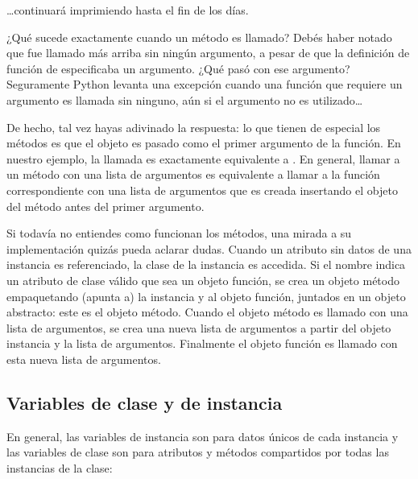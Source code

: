\documentclass[a4,10pt,spanish]{sphinxmanual}
\begin{document}
\sphinxAtStartPar
…continuará imprimiendo  hasta el fin de los días.

\sphinxAtStartPar
¿Qué sucede exactamente cuando un método es llamado?  Debés haber notado que  fue llamado más arriba sin ningún argumento, a pesar de que la definición de función de  especificaba un argumento.  ¿Qué pasó con ese argumento?  Seguramente Python levanta una excepción cuando una función que requiere un argumento es llamada sin ninguno, aún si el argumento no es utilizado…

\sphinxAtStartPar
De hecho, tal vez hayas adivinado la respuesta: lo que tienen de especial los métodos es que el objeto es pasado como el primer argumento de la función. En nuestro ejemplo, la llamada  es exactamente equivalente a .  En general, llamar a un método con una lista de  argumentos es equivalente a llamar a la función correspondiente con una lista de argumentos que es creada insertando el objeto del método antes del primer argumento.

\sphinxAtStartPar
Si todavía no entiendes como funcionan los métodos, una mirada a su implementación quizás pueda aclarar dudas. Cuando un atributo sin datos de una instancia es referenciado, la clase de la instancia es accedida. Si el nombre indica un atributo de clase válido que sea un objeto función, se crea un objeto método empaquetando (apunta a) la instancia y al objeto función, juntados en un objeto abstracto: este es el objeto método. Cuando el objeto método es llamado con una lista de argumentos, se crea una nueva lista de argumentos a partir del objeto instancia y la lista de argumentos. Finalmente el objeto función es llamado con esta nueva lista de argumentos.


\subsection{Variables de clase y de instancia}
\label{\detokenize{tutorial/classes:class-and-instance-variables}}\label{\detokenize{tutorial/classes:tut-class-and-instance-variables}}
\sphinxAtStartPar
En general, las variables de instancia son para datos únicos de cada instancia y las variables de clase son para atributos y métodos compartidos por todas las instancias de la clase:
\end{document}
